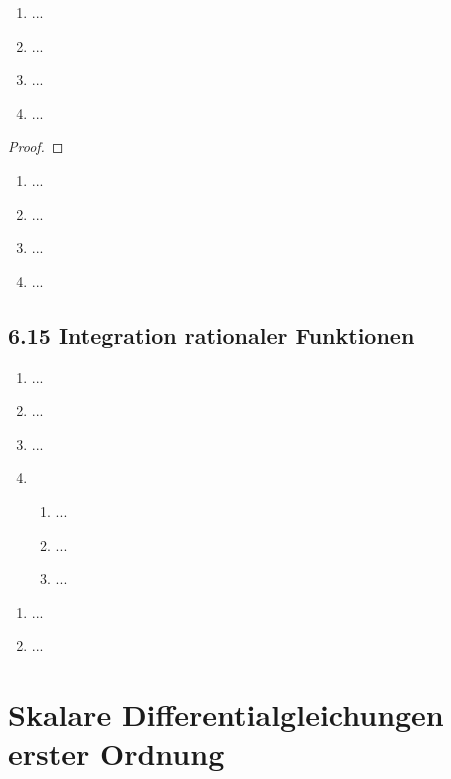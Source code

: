 \documentclass[12pt]{scrreprt}
\begin{document}
\begin{bsp}\label{}
\begin{enumerate}
\item ...
\item ...
\item ...
\item ...
\end{enumerate}
\end{bsp}

\begin{satz}\label{}

\end{satz}
\begin{proof}

\end{proof}

\begin{bsp}\label{}
\begin{enumerate}
\item ...
\item ...
\item ...
\item ...
\end{enumerate}
\end{bsp}

\subsection*{6.15 Integration rationaler Funktionen}
\label{}

\begin{enumerate}
\item ...
\item ...
\item ...
\item \begin{enumerate}
\item ...
\item ...
\item ...
\end{enumerate}
\end{enumerate}

\begin{bsp}\label{}
\begin{enumerate}
\item ...
\item ...
\end{enumerate}
\end{bsp}

\section{Skalare Differentialgleichungen erster Ordnung}
\label{}
\end{document}
